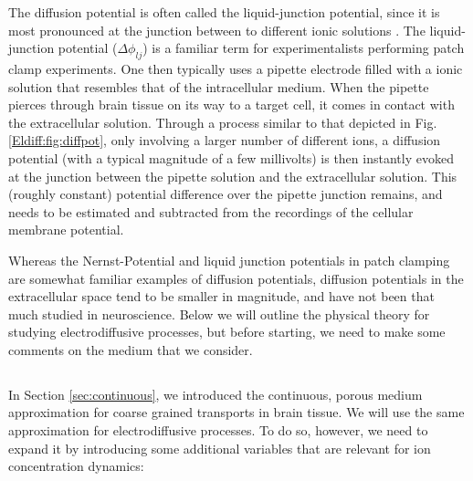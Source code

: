 The diffusion potential is often called the liquid-junction potential, since it is most pronounced at the junction between to different ionic solutions \cite{Sokalski2001}. The liquid-junction potential ($\Delta \phi_{lj}$) is a familiar term for experimentalists performing patch clamp experiments. One then typically uses a pipette electrode filled with a ionic solution that resembles that of the intracellular medium. When the pipette pierces through brain tissue on its way to a target cell, it comes in contact with the extracellular solution. Through a process similar to that depicted in Fig. \ref{Eldiff:fig:diffpot}, only involving a larger number of different ions, a diffusion potential (with a typical magnitude of a few millivolts) is then instantly evoked at the junction between the pipette solution and the extracellular solution. This (roughly constant) potential difference over the pipette junction remains, and needs to be estimated and subtracted from the recordings of the cellular membrane potential.

Whereas the Nernst-Potential and liquid junction potentials in patch clamping are somewhat familiar examples of diffusion potentials, diffusion potentials in the extracellular space tend to be smaller in magnitude, and have not been that much studied in neuroscience. Below we will outline the physical theory for studying electrodiffusive processes, but before starting, we need to make some comments on the medium that we consider. 


\subsection{}
\label{sec:Eldiff:porous}
In Section \ref{sec:continuous}, we introduced the continuous, porous medium approximation for coarse grained transports in brain tissue. We will use the same approximation for electrodiffusive processes. To do so, however, we need to expand it by introducing some additional variables that are relevant for ion concentration dynamics:

